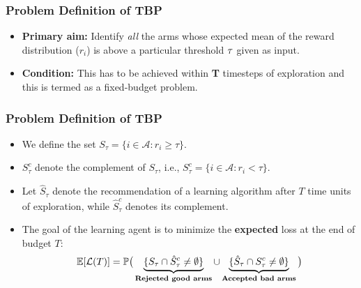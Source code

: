 \begin{frame}
\frametitle{Problem Definition of TBP}
\begin{itemize}
\item<1-> \textbf{Primary aim:} Identify \textit{all} the arms whose expected mean of the reward distribution ($r_i$) is above a particular threshold $\bold {\tau}$ given as input.
\item<2-> \textbf{Condition:} This has to be achieved within \textbf{T} timesteps of exploration and this is termed as a fixed-budget problem.
\end{itemize}
\end{frame}

\begin{frame}
\frametitle{Problem Definition of TBP}
\begin{itemize}
\item<1-> We define the set $S_{\tau}=\lbrace i\in \mathcal{A}: r_{i}\geq \tau \rbrace$. 
\item<2-> $S_\tau^c$ denote the complement of $S_\tau$, i.e.,  $S_{\tau}^{c}=\lbrace i\in \mathcal{A}: r_{i} < \tau \rbrace$. 
\item<3-> Let $\hat{S}_{\tau}$ denote the recommendation of a learning algorithm after $T$ time units of exploration, while $\hat{S}_{\tau}^c$ denotes its complement.
\item<4-> The goal of the learning agent is to minimize the \textbf{expected} loss at the end of budget $T$:
\begin{align*}
\mathbb{E}[\mathcal{L}(T)] &= \mathbb{P}\big(\underbrace{\lbrace S_{\tau}\cap \hat{S}_{\tau}^{c} \neq \emptyset \rbrace}_{\textbf{Rejected good arms}}  \cup   \underbrace{\lbrace \hat{S}_{\tau}\cap S_{\tau}^{c} \neq \emptyset\rbrace}_{\textbf{Accepted bad arms}}\big) \\
\end{align*}
\end{itemize}
\end{frame}

